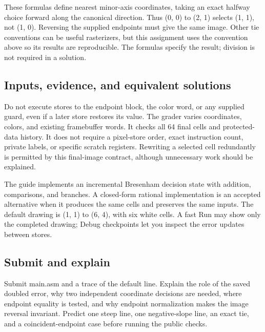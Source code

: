 These formulas define nearest minor-axis coordinates, taking an exact
halfway choice forward along the canonical direction. Thus (0, 0) to (2,
1) selects (1, 1), not (1, 0). Reversing the supplied endpoints must
give the same image. Other tie conventions can be useful rasterizers,
but this assignment uses the convention above so its results are
reproducible. The formulas specify the result; division is not required
in a solution.

\subsection{Inputs, evidence, and equivalent
  solutions}\label{007-bresenham-line-assignment-inputs-evidence-and-equivalent-solutions}

Do not execute stores to the endpoint block, the color word, or any
supplied guard, even if a later store restores its value. The grader
varies coordinates, colors, and existing framebuffer words. It checks
all 64 final cells and protected-data history. It does not require a
pixel-store order, exact instruction count, private labels, or specific
scratch registers. Rewriting a selected cell redundantly is permitted by
this final-image contract, although unnecessary work should be
explained.

The guide implements an incremental Bresenham decision state with
addition, comparisons, and branches. A closed-form rational
implementation is an accepted alternative when it produces the same
cells and preserves the same inputs. The default drawing is (1, 1) to
(6, 4), with six white cells. A fast Run may show only the completed
drawing; Debug checkpoints let you inspect the error updates between
stores.

\subsection{Submit and
  explain}\label{007-bresenham-line-assignment-submit-and-explain}

Submit main.asm and a trace of the default line. Explain the role of the
saved doubled error, why two independent coordinate decisions are
needed, where endpoint equality is tested, and why endpoint
normalization makes the image reversal invariant. Predict one steep
line, one negative-slope line, an exact tie, and a coincident-endpoint
case before running the public checks.
